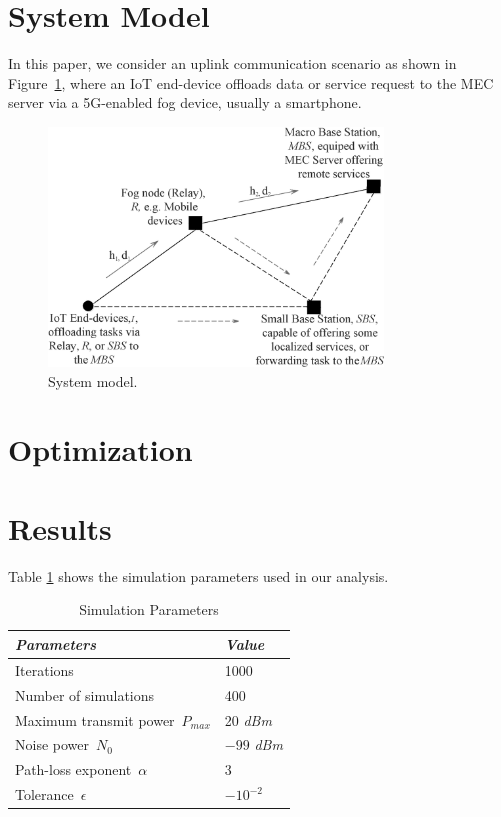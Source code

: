 \documentclass[conference,compsoc]{IEEEtran}
\theoremstyle{definition}
\begin{document}
\section{System Model}
In this paper, we consider an uplink communication scenario as shown in Figure~\ref{MECmodel}, where an IoT end-device offloads data or service request to the MEC server via a 5G-enabled fog device, usually a smartphone.



\begin{figure}[!t]
\centering
\includegraphics[width=3.5in]{MECmodel.eps}
\caption{System model.}
\label{MECmodel}
\end{figure}


\section{Optimization}





\section{Results}
Table \ref{table:parameters} shows the simulation parameters used in our analysis.
\begin{table}
\small
\centering
\caption{Simulation Parameters}
\label{table:parameters}
\begin{tabular}{ll}
  \hline
 \textit{Parameters} & \textit{Value} \\
  \hline \hline
   Iterations & 1000\\
   Number of simulations & 400\\
   Maximum transmit power~$P_{max}$  & 20 \emph{dBm}\\
   Noise power~$N_0$ & $-99$ \emph{dBm}\\
   Path-loss exponent~$\alpha$ & 3\\
   Tolerance~$\epsilon$ & $-10^{-2}$\\
      \hline \hline
 \end{tabular}
 \end{table}
\end{document}
